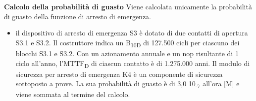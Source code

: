 \textbf{Calcolo della probabilità di guasto}
Viene calcolata unicamente la probabilità di guasto della funzione di arresto di emergenza.
\begin{itemize}
    \item il dispositivo di arresto di emergenza S3 è dotato di due contatti di apertura S3.1 e S3.2. Il costruttore indica un B\textsubscript{10D} di 127.500 cicli per ciascuno dei blocchi S3.1 e S3.2. Con un azionamento annuale e un nop risultante di 1 ciclo all'anno, l'MTTF\textsubscript{D} di ciascun contatto è di 1.275.000 anni. Il modulo di sicurezza per arresto di emergenza K4 è un componente di sicurezza sottoposto a prove. La sua probabilità di guasto è di 3,0 10\textsubscript{-7} all'ora [M] e viene sommata al termine del calcolo.
\end{itemize}


